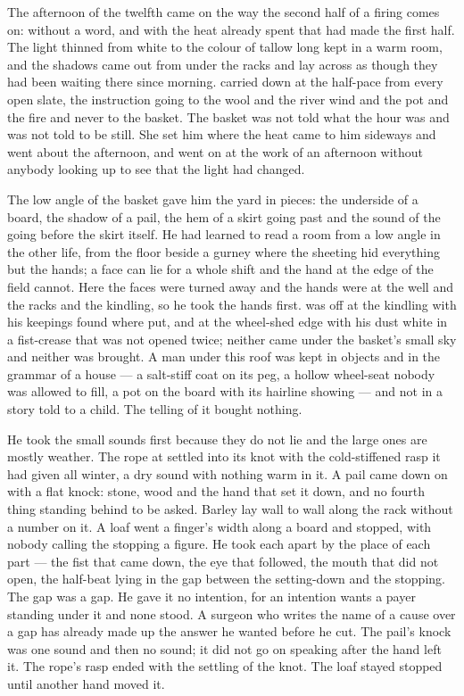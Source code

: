 The afternoon of the twelfth came on the way the second half of a firing comes on: without a word, and with the heat already spent that had made the first half. The light thinned from white to the colour of tallow long kept in a warm room, and the shadows came out from under the racks and lay across  as though they had been waiting there since morning.  carried  down  at the half-pace from every open slate, the instruction going to the wool and the river wind and the pot and the fire and never to the basket. The basket was not told what the hour was and was not told to be still. She set him where the heat came to him sideways and went about the afternoon, and  went on at the work of an afternoon without anybody looking up to see that the light had changed.

The low angle of the basket gave him the yard in pieces: the underside of a board, the shadow of a pail, the hem of a skirt going past and the sound of the going before the skirt itself. He had learned to read a room from a low angle in the other life, from the floor beside a gurney where the sheeting hid everything but the hands; a face can lie for a whole shift and the hand at the edge of the field cannot. Here the faces were turned away and the hands were at the well and the racks and the kindling, so he took the hands first.  was off at the kindling with his keepings found where put, and  at the wheel-shed edge with his dust white in a fist-crease that was not opened twice; neither came under the basket's small sky and neither was brought. A man under this roof was kept in objects and in the grammar of a house --- a salt-stiff coat on its peg, a hollow wheel-seat nobody was allowed to fill, a pot on the board with its hairline showing --- and not in a story told to a child. The telling of it bought nothing.

He took the small sounds first because they do not lie and the large ones are mostly weather. The rope at  settled into its knot with the cold-stiffened rasp it had given all winter, a dry sound with nothing warm in it. A pail came down on  with a flat knock: stone, wood and the hand that set it down, and no fourth thing standing behind to be asked. Barley lay wall to wall along the rack without a number on it. A loaf went a finger's width along a board and stopped, with nobody calling the stopping a figure. He took each apart by the place of each part --- the fist that came down, the eye that followed, the mouth that did not open, the half-beat lying in the gap between the setting-down and the stopping. The gap was a gap. He gave it no intention, for an intention wants a payer standing under it and none stood. A surgeon who writes the name of a cause over a gap has already made up the answer he wanted before he cut. The pail's knock was one sound and then no sound; it did not go on speaking after the hand left it. The rope's rasp ended with the settling of the knot. The loaf stayed stopped until another hand moved it.

